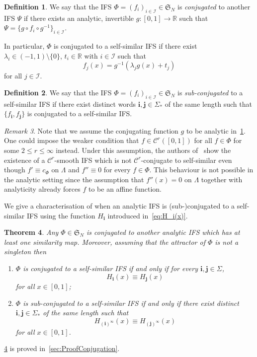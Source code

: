 \documentclass[11pt,]{article}
\def\cref#1{\ref{#1}}%
\newtheorem{theorem}{Theorem}[section]
\theoremstyle{definition}
\newtheorem{definition}[theorem]{Definition}
\theoremstyle{remark}
\newtheorem{remark}[theorem]{Remark}
\renewcommand{\Bbb}[1]{\mathbb{#1}}
\newcommand{\bbR}{{\Bbb R}}        %
\newcommand{\0}{\mathbf{0}}
\newcommand{\bi}{\mathbf{i}}
\newcommand{\bj}{\mathbf{j}}
\begin{document}
\begin{definition}\label{def:conjugation}
  We say that the IFS $\Phi = (f_i)_{i\in\mathcal{I}} \in\mathfrak{S}_N$ is 
\emph{conjugated} to another IFS $\Psi$ if there exists an analytic, invertible
  $g:[0,1]\to\bbR$ such that $\Psi=\{g\circ f_i\circ g^{-1}\}_{i\in\mathcal{I}}$. 
\end{definition}
In particular, $\Phi$
  is conjugated to a self-similar IFS if there exist $\lambda_i
\in(-1,1)\setminus\{0\}$, $t_i\in\bbR$ with $i\in\mathcal{I}$ such that
\[
f_{j}(x) = g^{-1}(\lambda_j g(x) + t_j)
\]
for all $j\in\mathcal{I}$.
\begin{definition}
  We say that the IFS $\Phi = (f_i)_{i\in\mathcal{I}} \in\mathfrak{S}_N$ is 
  \emph{sub-conjugated} to a self-similar IFS if there exist distinct words $\bi,\bj\in\Sigma_*$ of
  the same length such that $\{f_{\bi},f_{\bj}\}$ is conjugated to a self-similar IFS.
\end{definition}

\begin{remark}
  Note that we assume the conjugating function $g$ to be analytic in~\cref{def:conjugation}. One could
  impose the weaker condition that $f\in\mathcal{C}^r([0,1])$ for all $f\in\Phi$ for some $2\leq r\leq
  \infty$ instead. Under this assumption, the authors of~\cite{AlgomEtal_NonLinHyperbolicIFS} show the
  existence of a $\mathcal{C}^r$-smooth IFS which is not $\mathcal{C}^r$-conjugate to self-similar
  even though $f'\equiv c_{\Phi}$ on $\Lambda$ and $f''\equiv 0$ for every $f\in\Phi$. This behaviour
  is not possible in the analytic setting since the assumption that $f''(x)=0$ on $\Lambda$ together
  with analyticity already forces $f$ to be an affine function. 
\end{remark}

We give a characterisation of when an analytic IFS is (sub-)conjugated to a self-similar IFS using
the function $H_{\bi}$ introduced in~\cref{eq:H_i(x)}.

\begin{theorem}\label{thm:SubConjugation}
  Any $\Phi\in\mathfrak{S}_N$ is conjugated to another analytic IFS which has at least one similarity map. 
  Moreover, assuming that the attractor of $\Phi$ is not a singleton then 
  \begin{enumerate}
    \item\label{it:conj1} $\Phi$ is conjugated to a self-similar IFS if and only if for every $\bi,\bj\in\Sigma$,
      \[
	H_{\bi}(x) \equiv H_{\bj}(x)
      \]
      for all $x\in[0,1]$;
    \item\label{it:conj2} $\Phi$ is sub-conjugated to a self-similar IFS if and only if there exist distinct $\bi,\bj\in\Sigma_*$
      of the same length such that 
      \[
	H_{(\bi)^\infty}(x) \equiv H_{(\bj)^\infty}(x)
      \]
      for all $x\in[0,1]$.
  \end{enumerate}
\end{theorem}
\cref{thm:SubConjugation} is proved in~\cref{sec:ProofConjugation}.
\end{document}
